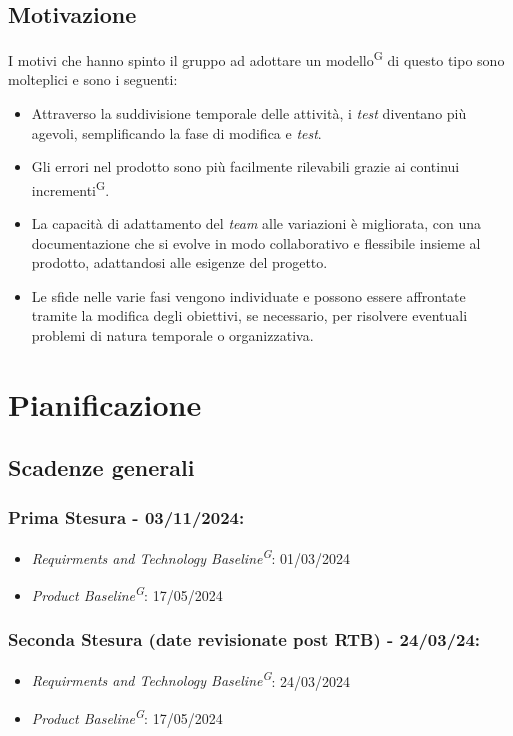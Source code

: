 \documentclass[5pt]{article}
\begin{document}
  \subsection{Motivazione}
    I motivi che hanno spinto il gruppo ad adottare un modello\textsuperscript{G} di questo tipo sono molteplici e sono i seguenti:
    \begin{itemize}
        \item Attraverso la suddivisione temporale delle attività, i \textit{test} diventano più agevoli, semplificando la fase di modifica e \textit{test}.
        \item Gli errori nel prodotto sono più facilmente rilevabili grazie ai continui incrementi\textsuperscript{G}.
        \item La capacità di adattamento del \textit{team} alle variazioni è migliorata, con una documentazione che si evolve in modo collaborativo e flessibile insieme al prodotto, adattandosi alle esigenze del progetto.
        \item Le sfide nelle varie fasi vengono individuate e possono essere affrontate tramite la modifica degli obiettivi, se necessario, per risolvere eventuali problemi di natura temporale o organizzativa.
    \end{itemize}


\section{Pianificazione}
\subsection{Scadenze generali}
\subsubsection{Prima Stesura - 03/11/2024:}
  \begin{itemize}
      \item \textit{Requirments and Technology Baseline\textsuperscript{G}}: 01/03/2024
      \item \textit{Product Baseline\textsuperscript{G}}: 17/05/2024
  \end{itemize}
\subsubsection{Seconda Stesura (date revisionate post RTB) - 24/03/24:}
  \begin{itemize}
      \item \textit{Requirments and Technology Baseline\textsuperscript{G}}: 24/03/2024
      \item \textit{Product Baseline\textsuperscript{G}}: 17/05/2024 
  \end{itemize}
\end{document}
